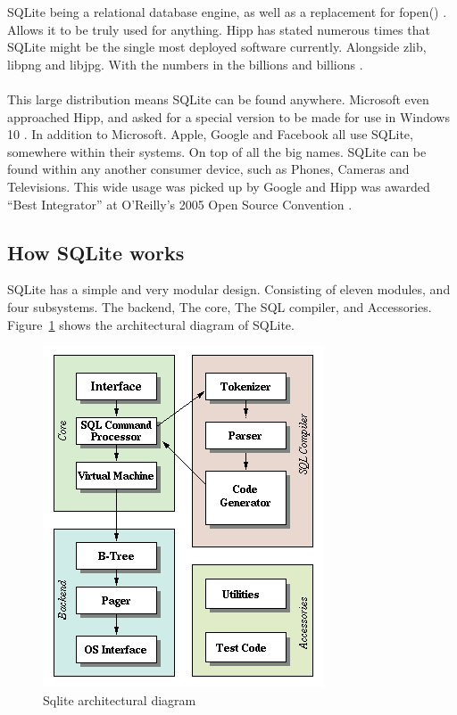 SQLite being a relational database engine, as well as a replacement for fopen() \citep{sqlite}. Allows it to be truly used for anything. Hipp has stated numerous times that SQLite might be the single most deployed software currently. Alongside zlib, libpng and libjpg. With the numbers in the billions and billions \citep{sqlite}.
\\\\
This large distribution means SQLite can be found anywhere. Microsoft even approached Hipp, and asked for a special version to be made for use in Windows 10 \citep{sqlitetalk}. In addition to Microsoft. Apple, Google and Facebook all use SQLite, somewhere within their systems. On top of all the big names. SQLite can be found within any another consumer device, such as Phones, Cameras and Televisions. This wide usage was picked up by Google and Hipp was awarded “Best Integrator” at O’Reilly’s 2005 Open Source Convention \citep{sqlitedefguide}. 

\subsection{How SQLite works}
\label{subsec:how_sqlite_works}

SQLite has a simple and very modular design. Consisting of eleven modules, and four subsystems. The backend, The core, The SQL compiler, and Accessories. Figure~\ref{fig:sqlite_arch} shows the architectural diagram of SQLite.

\begin{figure}[H]
	\centering
	\includegraphics[scale=0.50]{images/sqlite_arch.png}
	\caption{Sqlite architectural diagram \citep{sqlite}}
	\label{fig:sqlite_arch}
\end{figure}

